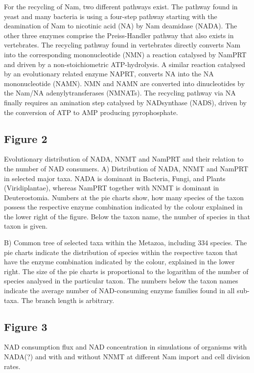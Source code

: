 \documentclass[paper=a4, 12pt]{scrartcl}
\begin{document}
For the recycling of Nam, two different pathways exist. The pathway found in yeast and many bacteria is using a four-step pathway starting with the deamination of Nam to nicotinic acid (NA) by Nam deamidase (NADA). The other three enzymes comprise the Preiss-Handler pathway that also exists in vertebrates. The recycling pathway found in vertebrates directly converts Nam into the corresponding mononucleotide (NMN) a reaction catalysed by NamPRT and driven by a non-stoichiometric ATP-hydrolysis. A similar reaction catalysed by an evolutionary related enzyme NAPRT, converts NA into the NA mononucleotide (NAMN). NMN and NAMN are converted into dinucleotides by the Nam/NA adenylytransferases (NMNATs). The recycling pathway via NA finally requires an amination step catalysed by NADsynthase (NADS), driven by the conversion of ATP to AMP producing pyrophosphate.


\subsection{Figure 2}

Evolutionary distribution of NADA, NNMT and NamPRT and their relation to the number of NAD consumers. A) Distribution of NADA, NNMT and NamPRT in selected major taxa. NADA is dominant in Bacteria, Fungi, and Plants (Viridiplantae), whereas NamPRT together with NNMT is dominant in Deuterostomia. Numbers at the pie charts show, how many species of the taxon possess the respective enzyme combination indicated by the colour explained in the lower right of the figure. Below the taxon name, the number of species in that taxon is given.

B) Common tree of selected taxa within the Metazoa, including 334 species. The pie charts indicate the distribution of species within the respective taxon that have the enzyme combination indicated by the colour, explained in the lower right. The size of the pie charts is proportional to the logarithm of the number of species analysed in the particular taxon. The numbers below the taxon names indicate the average number of NAD-consuming enzyme families found in all sub-taxa. The branch length is arbitrary.


\subsection{Figure 3}

NAD consumption flux and NAD concentration in simulations of organisms with NADA(?) and with and without NNMT at different Nam import and cell division rates.
\end{document}
